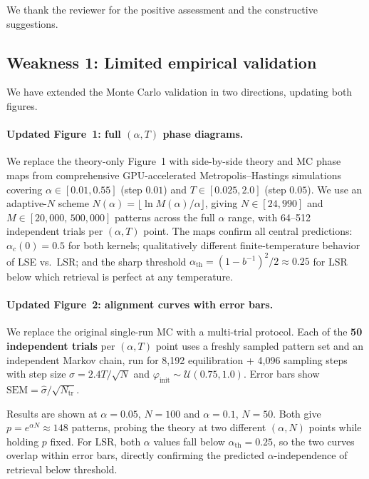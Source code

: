 \documentclass[11pt]{article}
\begin{document}
We thank the reviewer for the positive assessment and the
constructive suggestions.

\subsection*{Weakness 1: Limited empirical validation}

We have extended the Monte Carlo validation in two directions,
updating both figures.

\paragraph{Updated Figure~1: full $(\alpha, T)$ phase diagrams.}
We replace the theory-only Figure~1 with side-by-side theory
and MC phase maps from comprehensive GPU-accelerated
Metropolis--Hastings simulations covering
$\alpha \in [0.01, 0.55]$ (step $0.01$) and
$T \in [0.025, 2.0]$ (step $0.05$).
We use an adaptive-$N$ scheme
$N(\alpha) = \lfloor \ln M(\alpha)/\alpha \rfloor$,
giving $N \in [24, 990]$ and
$M \in [20{,}000,\, 500{,}000]$ patterns across the full
$\alpha$ range, with 64--512 independent trials per
$(\alpha, T)$ point.
The maps confirm all central predictions: $\alpha_c(0)=0.5$
for both kernels; qualitatively different finite-temperature
behavior of LSE vs.\ LSR; and the sharp threshold
$\alpha_{\mathrm{th}} = (1-b^{-1})^2/2 \approx 0.25$ for
LSR below which retrieval is perfect at any temperature.

\paragraph{Updated Figure~2: alignment curves with error bars.}
We replace the original single-run MC with a multi-trial
protocol. Each of the \textbf{50 independent trials} per
$(\alpha, T)$ point uses a freshly sampled pattern set and
an independent Markov chain, run for 8{,}192 equilibration
+ 4{,}096 sampling steps with step size
$\sigma = 2.4T/\!\sqrt{N}$ and
$\varphi_{\mathrm{init}} \sim \mathcal{U}(0.75, 1.0)$.
Error bars show $\mathrm{SEM} = \hat{\sigma}/\!\sqrt{N_{\mathrm{tr}}}$.

Results are shown at $\alpha=0.05$, $N=100$ and
$\alpha=0.1$, $N=50$. Both give
$p = e^{\alpha N} \approx 148$ patterns, probing the theory
at two different $(\alpha, N)$ points while holding $p$
fixed. For LSR, both $\alpha$ values fall below
$\alpha_{\mathrm{th}}=0.25$, so the two curves overlap
within error bars, directly confirming the predicted
$\alpha$-independence of retrieval below threshold.
\end{document}
